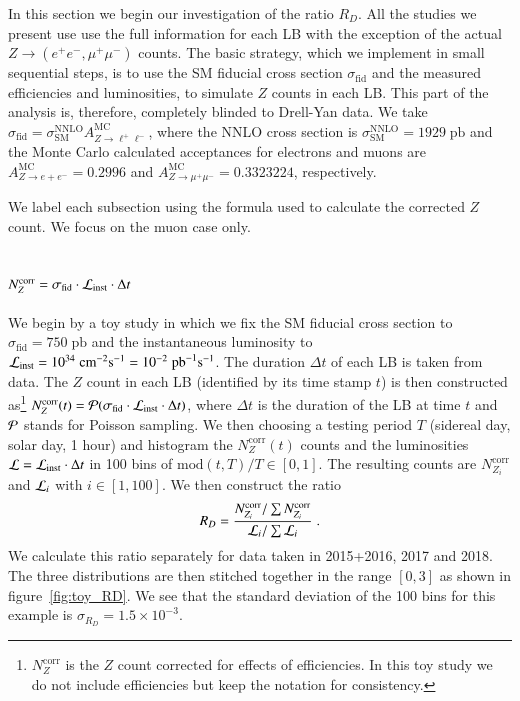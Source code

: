 In this section we begin our investigation of the ratio $R_D$. All the studies we present use use the full information for each LB with the exception of the actual $Z\to (e^+e^-,\mu^+\mu^-)$ counts. The basic strategy, which we implement in small sequential steps, is to use the SM fiducial cross section $\sigma_\text{fid}$ and the measured efficiencies and luminosities, to simulate $Z$ counts in each LB. This part of the analysis is, therefore, completely blinded to Drell-Yan data. We take 
$\sigma_\text{fid} = \sigma_\text{SM}^\text{NNLO} A^\text{MC}_{Z\to \ell^+\ell^-}$, where the NNLO cross section is $\sigma_\text{SM}^\text{NNLO} = 1929\; \text{pb}$ and the Monte Carlo calculated acceptances for electrons and muons are $A^\text{MC}_{Z\to e+e^-} = 0.2996$ and $A^\text{MC}_{Z\to \mu^+\mu^-} = 0.3323224$, respectively.

We label each subsection using the formula used to calculate the corrected $Z$ count. We focus on the muon case only.

\subsection{\texorpdfstring{$N_Z^\text{corr} = \sigma_\text{fid} \cdot {\cal L}_\text{inst}\cdot  \Delta t$}{NZcorr = sigmafid * Linst * Delta t}}
\label{ssec:all_constant}
We begin by a toy study in which we fix the SM fiducial cross section to $\sigma_\text{fid} = 750\; \text{pb}$ and the instantaneous luminosity to ${\cal L}_\text{inst} = 10^{34}\; \text{cm}^{-2} \text{s}^{-1} = 10^{-2}\;  \text{pb}^{-1} \text{s}^{-1}$. The duration $\Delta t$ of each LB is taken from data. The $Z$ count in each LB (identified by its time stamp $t$) is then constructed as\footnote{$N_Z^\text{corr}$ is the $Z$ count corrected for effects of efficiencies. In this toy study we do not include efficiencies but keep the notation for consistency.} $N_Z^\text{corr}(t) = {\cal P} (\sigma_\text{fid} \cdot {\cal L}_\text{inst} \cdot \Delta t)$, where $\Delta t$ is the duration of the LB at time $t$ and ${\cal P}$ stands for Poisson sampling. We then choosing a testing period $T$ (sidereal day, solar day, 1 hour) and histogram the $N_Z^\text{corr}(t)$ counts and the luminosities ${\cal L}= {\cal L}_\text{inst} \cdot \Delta t$ in 100 bins of $\text{mod} (t,T)/T \in [0,1]$. The resulting counts are $N_{Z_i}^\text{corr}$ and ${\cal L}_i$ with $i\in[1,100]$. We then construct the ratio 
%
\begin{align}
R_D = \frac{ N_{Z_i}^\text{corr} / \sum N_{Z_i}^\text{corr} }{ {\cal L}_i / \sum {\cal L}_i} \; .
\label{eq:RD}
\end{align}
%
We calculate this ratio separately for data taken in 2015+2016, 2017 and 2018. The three distributions are then stitched together in the range $[0,3]$ as shown in figure~\ref{fig:toy_RD}. We see that the standard deviation of the 100 bins for this example is $\sigma_{R_D} = 1.5 \times 10^{-3}$.

